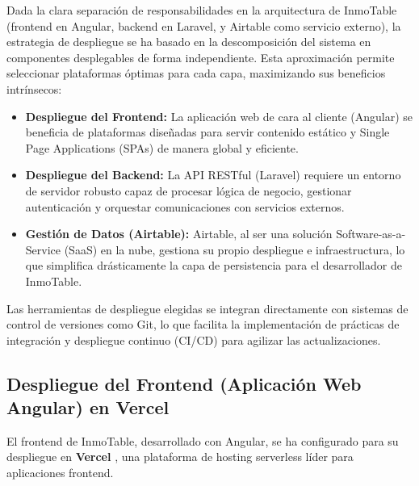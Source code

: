 Dada la clara separación de responsabilidades en la arquitectura de InmoTable (frontend en Angular, backend en Laravel, y Airtable como servicio externo), la estrategia de despliegue se ha basado en la descomposición del sistema en componentes desplegables de forma independiente. Esta aproximación permite seleccionar plataformas óptimas para cada capa, maximizando sus beneficios intrínsecos:

\begin{itemize}
    \item \textbf{Despliegue del Frontend:} La aplicación web de cara al cliente (Angular) se beneficia de plataformas diseñadas para servir contenido estático y Single Page Applications (SPAs) de manera global y eficiente.

    \item \textbf{Despliegue del Backend:} La API RESTful (Laravel) requiere un entorno de servidor robusto capaz de procesar lógica de negocio, gestionar autenticación y orquestar comunicaciones con servicios externos.

    \item \textbf{Gestión de Datos (Airtable):} Airtable, al ser una solución Software-as-a-Service (SaaS) en la nube, gestiona su propio despliegue e infraestructura, lo que simplifica drásticamente la capa de persistencia para el desarrollador de InmoTable.
\end{itemize}

Las herramientas de despliegue elegidas se integran directamente con sistemas de control de versiones como Git, lo que facilita la implementación de prácticas de integración y despliegue continuo (CI/CD) para agilizar las actualizaciones.


\subsection{Despliegue del Frontend (Aplicación Web Angular) en Vercel}


El frontend de InmoTable, desarrollado con Angular, se ha configurado para su despliegue en \textbf{Vercel} \cite{vercel2024docs}, una plataforma de hosting serverless líder para aplicaciones frontend.

